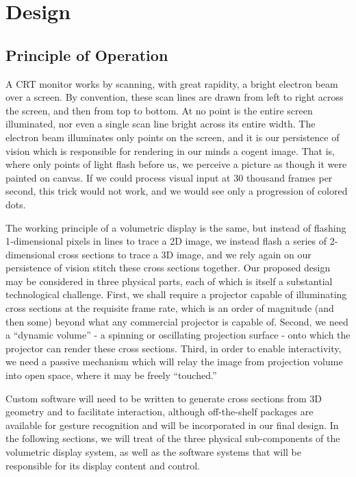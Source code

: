 \documentclass[12pt]{article}
\begin{document}
\section{Design}
\subsection{Principle of Operation}
A CRT monitor works by scanning, with great rapidity, a bright electron beam over a screen. By convention, these scan lines are drawn from left to right across the screen, and then from top to bottom. At no point is the entire screen illuminated, nor even a single scan line bright across its entire width. The electron beam illuminates only points on the screen, and it is our persistence of vision which is responsible for rendering in our minds a cogent image. That is, where only points of light flash before us, we perceive a picture as though it were painted on canvas. If we could process visual input at 30 thousand frames per second, this trick would not work, and we would see only a progression of colored dots.

The working principle of a volumetric display is the same, but instead of flashing 1-dimensional pixels in lines to trace a 2D image, we instead flash a series of 2-dimensional cross sections to trace a 3D image, and we rely again on our persistence of vision stitch these cross sections together. Our proposed design may be considered in three physical parts, each of which is itself a substantial technological challenge. First, we shall require a projector capable of illuminating cross sections at the requisite frame rate, which is an order of magnitude (and then some) beyond what any commercial projector is capable of. Second, we need a “dynamic volume” - a spinning or oscillating projection surface - onto which the projector can render these cross sections. Third, in order to enable interactivity, we need a passive mechanism which will relay the image from projection volume into open space, where it may be freely “touched.”

Custom software will need to be written to generate cross sections from 3D geometry and to facilitate interaction, although off-the-shelf packages are available for gesture recognition and will be incorporated in our final design. In the following sections, we will treat of the three physical sub-components of the volumetric display system, as well as the software systems that will be responsible for its display content and control.
\end{document}
